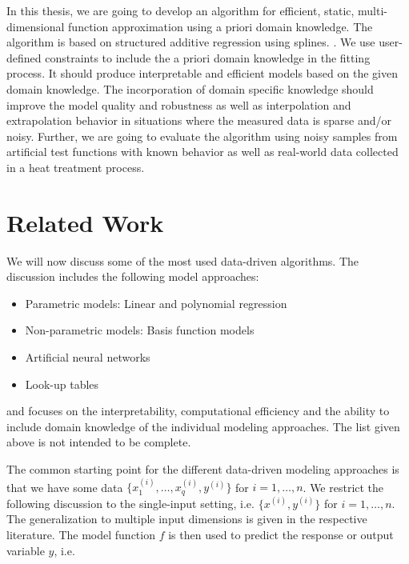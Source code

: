 \documentclass[10pt,a4paper]{article}
\begin{document}
In this thesis, we are going to develop an algorithm for efficient, static, multi-dimensional function approximation using a priori domain knowledge. The algorithm is based on structured additive regression using splines. \cite{fahrmeir2013regression}. We use user-defined constraints to include the a priori domain knowledge in the fitting process. \cite{hofner2011monotonicity} It should produce interpretable and efficient models based on the given domain knowledge. The incorporation of domain specific knowledge should improve the model quality and robustness as well as interpolation and extrapolation behavior in situations where the measured data is sparse and/or noisy. Further, we are going to evaluate the algorithm using noisy samples from artificial test functions with known behavior as well as real-world data collected in a heat treatment process. 
\section{Related Work}

We will now discuss some of the most used data-driven algorithms. The discussion includes the following model approaches:

\begin{itemize}
	\item Parametric models: Linear and polynomial regression
	\item Non-parametric models: Basis function models
	\item Artificial neural networks
	\item Look-up tables
\end{itemize}

and focuses on the interpretability, computational efficiency and the ability to include domain knowledge of the individual modeling approaches. The list given above is not intended to be complete. 

The common starting point for the different data-driven modeling approaches is that we have some data $\{x_1^{(i)}, \dots, x_q^{(i)}, y^{(i)} \}$ for $i = 1, \dots, n$. We restrict the following discussion to the single-input setting, i.e. $\{x^{(i)}, y^{(i)}\}$ for $i=1, \dots, n$. The generalization to multiple input dimensions is given in the respective literature. The model function $f$ is then used to predict the response or output variable $y$, i.e.
\end{document}
